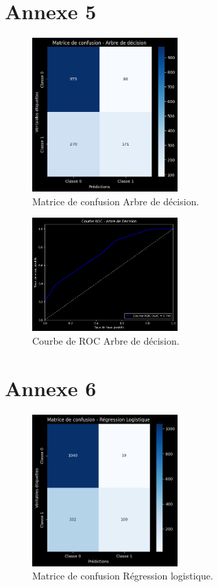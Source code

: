 \section*{Annexe 5}
\label{sec:annexe5}
\begin{figure}[H]
\centering
\includegraphics[width=0.5\textwidth]{figures/MatriceArbre.png}
\caption{Matrice de confusion Arbre de décision.}
\label{fig:annexe5}
\end{figure}


\begin{figure}[H]
\centering
\includegraphics[width=0.5\textwidth]{figures/ROCArbre.png}
\caption{Courbe de ROC Arbre de décision.}
\end{figure}


\section*{Annexe 6}
\label{sec:annexe6}
\begin{figure}[H]
\centering
\includegraphics[width=0.5\textwidth]{figures/MatriceRL.png}
\caption{Matrice de confusion Régression logistique.}
\label{fig:annexe6}
\end{figure}


